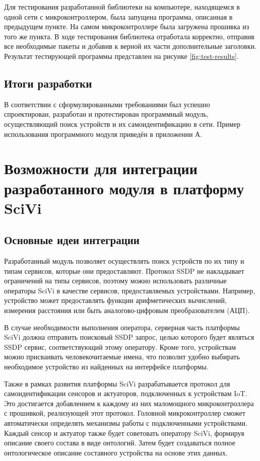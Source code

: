 Для тестирования разработанной библиотеки на компьютере, находящемся в одной сети с микроконтроллером, была запущена программа, описанная в предыдущем пункте.
На самом микроконтроллере была загружена прошивка из того же пункта.
В ходе тестирования библиотека отработала корректно, отправив все необходимые пакеты и добавив к верной их части дополнительные заголовки.
Результат тестирующей программы представлен на рисунке \ref{fig:test-results}.


\subsection{Итоги разработки}

В соответствии с сформулированными требованиями был успешно спроектирован, разработан и протестирован программный модуль, осуществляющий поиск устройств и их самоидентификацию в сети.
Пример использования программного модуля приведён в приложении А.


\section{Возможности для интеграции разработанного модуля в платформу SciVi}

\subsection{Основные идеи интеграции}

Разработанный модуль позволяет осуществлять поиск устройств по их типу и типам сервисов, которые они предоставляют.
Протокол SSDP не накладывает ограничений на типы сервисов, поэтому можно использовать различные операторы SciVi в качестве сервисов, предоставляемых устройствами.
Например, устройство может предоставлять функции арифметических вычислений, измерения расстояния или быть аналогово-цифровым преобразователем (АЦП).

В случае необходимости выполнения оператора, серверная часть платформы SciVi должна отправить поисковый SSDP запрос, целью которого будет являться SSDP сервис, соответствующий этому оператору.
Кроме того, устройствам можно присваивать человекочитаемые имена, что позволит удобно выбирать необходимое устройство из найденных на интерфейсе платформы.

Также в рамках развития платформы SciVi разрабатывается протокол для самоидентификации сенсоров и актуаторов, подключенных к устройствам IoT.
Это достигается добавлением к каждому из них маломощного микроконтроллера с прошивкой, реализующей этот протокол.
Головной микроконтроллер сможет автоматически определять механизмы работы с подключенными устройствами.
Каждый сенсор и актуатор также будет советовать оператору SciVi, формируя описание своего состава в виде онтологий.
Затем будет создаваться полное онтологическое описание составного устройства на основе этих данных.

